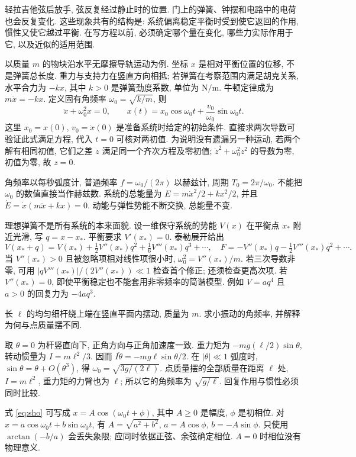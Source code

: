 \label{ch:osc}
轻拉吉他弦后放手, 弦反复经过静止时的位置. 门上的弹簧、钟摆和电路中的电荷也会反复变化. 这些现象共有的结构是: 系统偏离稳定平衡时受到使它返回的作用, 惯性又使它越过平衡. 在写方程以前, 必须确定哪个量在变化, 哪些力实际作用于它, 以及近似的适用范围.

以质量 $m$ 的物块沿水平无摩擦导轨运动为例. 坐标 $x$ 是相对平衡位置的位移, 不是弹簧总长度. 重力与支持力在竖直方向相抵; 若弹簧在考察范围内满足胡克关系, 水平合力为 $-kx$, 其中 $k>0$ 是弹簧劲度系数, 单位为 $\mathrm{N/m}$. 牛顿定律成为 $m\ddot x=-kx$. 定义固有角频率 $\omega_0=\sqrt{k/m}$, 则
\begin{equation}\label{eq:sho}
\ddot x+\omega_0^2x=0,\qquad
x(t)=x_0\cos\omega_0t+\frac{v_0}{\omega_0}\sin\omega_0t.
\end{equation}
这里 $x_0=x(0)$, $v_0=\dot x(0)$ 是准备系统时给定的初始条件. 直接求两次导数可验证此式满足方程, 代入 $t=0$ 可核对两初值. 为说明没有遗漏另一种运动, 若两个解有相同初值, 它们之差 $z$ 满足同一个齐次方程及零初值; $\dot z^2+\omega_0^2z^2$ 的导数为零, 初值为零, 故 $z=0$.

角频率以每秒弧度计, 普通频率 $f=\omega_0/(2\pi)$ 以赫兹计, 周期 $T_0=2\pi/\omega_0$. 不能把 $\omega_0$ 的数值直接当作赫兹数. 系统的总能量为 $E=m\dot x^2/2+kx^2/2$, 并且 $\dot E=\dot x(m\ddot x+kx)=0$. 动能与弹性势能不断交换, 总能量不变.

理想弹簧不是所有系统的本来面貌. 设一维保守系统的势能 $V(x)$ 在平衡点 $x_*$ 附近光滑, 写 $q=x-x_*$. 平衡要求 $V'(x_*)=0$. 泰勒展开给出
\[
V(x_*+q)=V(x_*)+\tfrac12 V''(x_*)q^2+\tfrac16 V'''(x_*)q^3+\cdots,
\quad F=-V''(x_*)q-\tfrac12 V'''(x_*)q^2+\cdots.
\]
当 $V''(x_*)>0$ 且被忽略项相对线性项很小时, $\omega_0^2=V''(x_*)/m$. 若三次导数非零, 可用 $|qV'''(x_*)|/(2V''(x_*))\ll1$ 检查首个修正; 还须检查更高次项. 若 $V''(x_*)=0$, 即使平衡稳定也不能套用非零频率的简谐模型. 例如 $V=aq^4$ 且 $a>0$ 的回复力为 $-4aq^3$.

\begin{example}
长 $\ell$ 的均匀细杆绕上端在竖直平面内摆动, 质量为 $m$. 求小振动的角频率, 并解释为何与点质量摆不同.
\end{example}
\begin{solution}
取 $\theta=0$ 为杆竖直向下, 正角方向与正角加速度一致. 重力矩为 $-mg(\ell/2)\sin\theta$, 转动惯量为 $I=m\ell^2/3$. 因而 $I\ddot\theta=-mg\ell\sin\theta/2$. 在 $|\theta|\ll1$ 弧度时, $\sin\theta=\theta+O(\theta^3)$, 得 $\omega_0=\sqrt{3g/(2\ell)}$. 点质量摆的全部质量在距离 $\ell$ 处, $I=m\ell^2$, 重力矩的力臂也为 $\ell$; 所以它的角频率为 $\sqrt{g/\ell}$. 回复作用与惯性必须同时比较.
\end{solution}
式 \eqref{eq:sho} 可写成 $x=A\cos(\omega_0t+\phi)$, 其中 $A\ge0$ 是幅度, $\phi$ 是初相位. 对 $x=a\cos\omega_0t+b\sin\omega_0t$, 有 $A=\sqrt{a^2+b^2}$, $a=A\cos\phi$, $b=-A\sin\phi$. 只使用 $\arctan(-b/a)$ 会丢失象限; 应同时依据正弦、余弦确定相位. $A=0$ 时相位没有物理意义.

